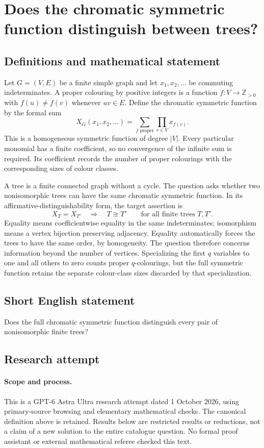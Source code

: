 \documentclass[11pt,a4paper]{article}
\begin{document}
\section*{Does the chromatic symmetric function distinguish between trees?}\label{statement}

\subsection{Definitions and mathematical statement}
Let $G=(V,E)$ be a finite simple graph and let
$x_1,x_2,\ldots$ be commuting indeterminates. A proper colouring by
positive integers is a function $f:V\to\mathbb Z_{>0}$ with
$f(u)\neq f(v)$ whenever $uv\in E$. Define the chromatic symmetric
function by the formal sum
\[
 X_G(x_1,x_2,\ldots)
   =\sum_{f\text{ proper}}\prod_{v\in V}x_{f(v)}.
\]
This is a homogeneous symmetric function of degree $|V|$. Every
particular monomial has a finite coefficient, so no convergence
of the infinite sum is required. Its coefficient records the
number of proper colourings with the corresponding sizes of
colour classes.

A tree is a finite connected graph without a cycle. The question
asks whether two nonisomorphic trees can have the same chromatic
symmetric function. In its affirmative-distinguishability form,
the target assertion is
\[
 X_T=X_{T'}\quad\Longrightarrow\quad T\cong T'
 \qquad\text{for all finite trees }T,T'.
\]
Equality means coefficientwise equality in the same indeterminates;
isomorphism means a vertex bijection preserving adjacency. Equality
automatically forces the trees to have the same order, by
homogeneity. The question therefore concerns information beyond
the number of vertices. Specializing the first $q$ variables to
one and all others to zero counts proper $q$-colourings, but the
full symmetric function retains the separate colour-class sizes
discarded by that specialization.
\subsection{Short English statement}
Does the full chromatic symmetric function distinguish every pair of nonisomorphic finite trees?
\subsection{Research attempt}
\paragraph{Scope and process.}
This is a GPT-6 Astra Ultra research attempt dated 1 October 2026, using
primary-source browsing and elementary mathematical checks. The canonical
definition above is retained. Results below are restricted results or
reductions, not a claim of a new solution to the entire catalogue question.
No formal proof assistant or external mathematical referee checked this text.
\end{document}
